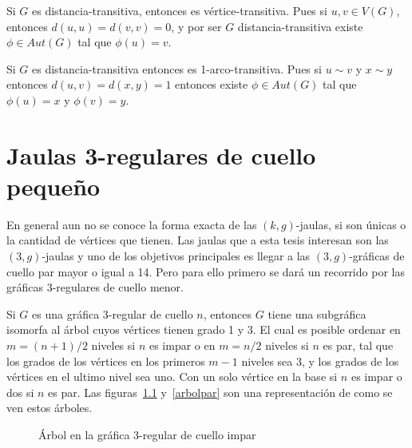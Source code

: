 \documentclass[12pt]{book}
\theoremstyle{definition}
\begin{document}
Si $G$ es distancia-transitiva, entonces es
vértice-transitiva. Pues si $u,v \in V(G)$, entonces
$d(u,u)=d(v,v)=0$, y por ser $G$ distancia-transitiva existe
$\phi\in Aut(G)$ tal que $\phi(u)=v$.

Si $G$ es distancia-transitiva entonces es
1-arco-transitiva. Pues si $u\sim v$ y $x\sim y$ entonces
$d(u,v)=d(x,y)=1$ entonces existe $\phi \in Aut(G)$ tal que
$\phi(u)=x$ y $\phi(v)=y$.

\chapter{Jaulas 3-regulares de cuello pequeño}

En general aun no se conoce la forma exacta de las $(k,g)$-jaulas, si
son únicas o la cantidad de vértices que tienen. Las jaulas que a esta
tesis interesan son las $(3,g)$-jaulas y uno de los objetivos
principales es llegar a las $(3,g)$-gráficas de cuello par mayor o
igual a 14. Pero para ello primero se dará un recorrido por las
gráficas $3$-regulares de cuello menor. 


Si $G$ es una gráfica 3-regular de cuello $n$, entonces $G$ tiene
una subgráfica isomorfa al árbol cuyos vértices tienen grado 1 y 3. El
cual es posible ordenar en $m=(n + 1)/ 2$ niveles si $n$ es impar o en
$m=n/ 2$ niveles si $n$ es par, tal que los grados de los vértices
en los primeros $m-1$ niveles sea 3, y los grados de los vértices en
el ultimo nivel sea uno. Con un solo vértice en la base si $n$ es
impar o dos si $n$ es par. Las figuras~\ref{arbolimpar}
y~\ref{arbolpar} son una representación de como se ven estos árboles.

\begin{figure}
    \centering
    \caption{Árbol en la gráfica 3-regular de cuello impar}\label{arbolimpar}
  \end{figure}
\end{document}
